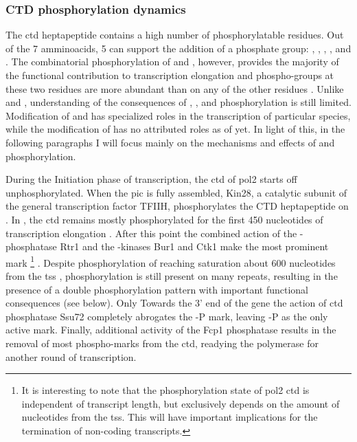 \subsubsection{CTD phosphorylation dynamics} 
The \gls{ctd} heptapeptide contains a high number of phosphorylatable residues.
Out of the 7 amminoacids, 5 can support the addition of a phosphate group: \tyr{}, \sert{}, \thr{}, \serf{}, and \sers{}.
The combinatorial phosphorylation of \sert{} and \serf{}, however, provides the majority of the functional contribution to transcription elongation and phospho-groups at these two residues are  more abundant than on any of the other residues \citep{suh:2016:direct}. Unlike \sert{} and \serf{}, understanding of the consequences of \tyr{}, \thr{}, and \sers{} phosphorylation is still limited. 
Modification of \thr{} and \sers{} has specialized roles in the transcription of particular species, while the modification of \tyr{} has no attributed roles as of yet. 
In light of this, in the following paragraphs I will focus mainly on the mechanisms and effects of \sert{} and \serf{} phosphorylation.


During the Initiation phase of transcription, the \gls{ctd} of \gls{pol2} starts off unphosphorylated.
When the \gls{pic} is fully assembled, Kin28, a catalytic subunit of the general transcription factor TFIIH, phosphorylates the CTD heptapeptide on \serf{}.
In \cer{}, the \gls{ctd} remains mostly \serf{} phosphorylated for the first 450 nucleotides of transcription elongation \citep{mayer:2010:uniform}. 
After this point the combined action of the \serf{}-phosphatase Rtr1 \citep{mosley:2009:rtr1} and the \sert{}-kinases Bur1 and Ctk1 \citep{qiu:2009:phosphorylation} make \sert{} the most prominent mark \footnote{
It is interesting to note that the phosphorylation state of \gls{pol2} \gls{ctd} is independent of transcript length, but exclusively depends on the amount of nucleotides from the \gls{tss}. 
This will have important implications for the termination of non-coding transcripts.} .
Despite phosphorylation of \sert{} reaching saturation about 600 nucleotides from the \gls{tss} \citep{mayer:2010:uniform}, \serf{} phosphorylation is still present on many repeats, resulting in the presence of a double phosphorylation pattern with important functional consequences (see below).
Only Towards the 3' end of the gene the action of \gls{ctd} phosphatase Ssu72 completely abrogates the \serf{}-P mark, leaving \sert{}-P as the only active mark.
Finally, additional activity of the Fcp1 phosphatase results in the removal of most phospho-marks from the \gls{ctd}, readying the polymerase for another round of transcription.

